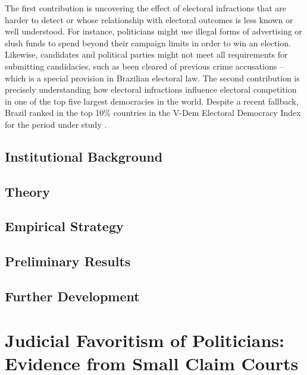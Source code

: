 \documentclass[11pt]{article}
\begin{document}
The first contribution is uncovering the effect of electoral infractions that are harder to detect or whose relationship with electoral outcomes is less known or well understood. For instance, politicians might use illegal forms of advertising or slush funds to spend beyond their campaign limits in order to win an election. Likewise, candidates and political parties might not meet all requirements for submitting candidacies, such as been cleared of previous crime accusations -- which is a special provision in Brazilian electoral law. The second contribution is precisely understanding how electoral infractions influence electoral competition in one of the top five largest democracies in the world. Despite a recent fallback, Brazil ranked in the top 10\% countries in the V-Dem Electoral Democracy Index for the period under study \citep{CoppedgeVDemCountryYearDataset2018}.

\subsection{Institutional Background}

\subsection{Theory}

\subsection{Empirical Strategy}

\subsection{Preliminary Results}











\subsection{Further Development}

\clearpage

\section{Judicial Favoritism of Politicians: Evidence from Small Claim Courts} \label{sec:paper2}
\end{document}
